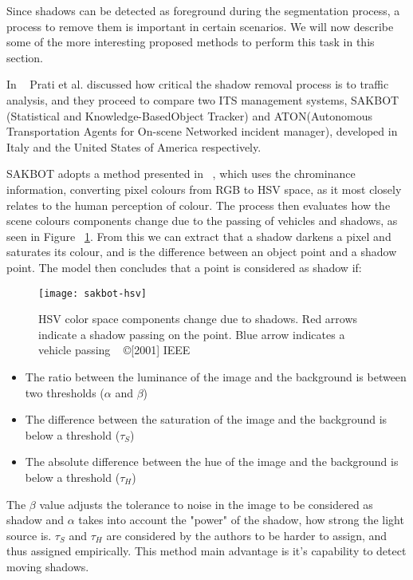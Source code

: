 Since shadows can be detected as foreground during the segmentation process, a process to remove them is important in certain scenarios. We will now describe some of the more interesting proposed methods to perform this task in this section.

In ~\cite{prati_shadow_2001} Prati et al. discussed how critical the shadow removal process is to traffic analysis, and they proceed to compare two ITS management systems, SAKBOT (Statistical and Knowledge-BasedObject Tracker) and ATON(Autonomous Transportation Agents for On-scene Networked incident manager), developed in Italy and the United States of America respectively.

SAKBOT adopts a method presented in ~\cite{cucchiara_statistic_2000}, which uses the chrominance information, converting pixel colours from RGB to HSV space, as it most closely relates to the human perception of colour. The process then evaluates how the scene colours components change due to the passing of vehicles and shadows, as seen in Figure ~\ref{fig:sakbot-hsv}. From this we can extract that a shadow darkens a pixel and saturates its colour, and is the difference between an object point and a shadow point. The model then concludes that a point is considered as shadow if:

\begin{figure}[h]
  \begin{center}
    \leavevmode
    \texttt{[image: sakbot-hsv]}
    \captionsetup{justification=centering}
    \caption{HSV color space components change due to shadows. Red arrows indicate a shadow passing on the point. Blue arrow indicates a vehicle passing ~\cite{prati_shadow_2001} ©[2001] IEEE}
    \label{fig:sakbot-hsv}
  \end{center}
\end{figure}

\begin{itemize}
	\item The ratio between the luminance of the image and the background is between two thresholds ($\alpha$ and $\beta$)
	\item The difference between the saturation of the image and the background is below a threshold ($\tau_{S}$)
	\item The absolute difference between the hue of the image and the background is below a threshold ($\tau_{H}$)
\end{itemize}

The $\beta$ value adjusts the tolerance to noise in the image to be considered as shadow and $\alpha$ takes into account the "power" of the shadow, how strong the light source is. $\tau_{S}$ and $\tau_{H}$ are considered by the authors to be harder to assign, and thus assigned empirically. This method main advantage is it's capability to detect moving shadows.

